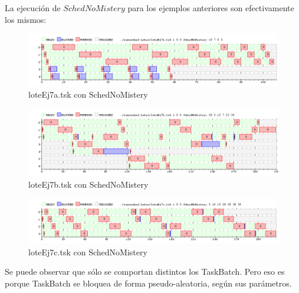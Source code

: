 La ejecuci\'on de $SchedNoMistery$ para los ejemplos anteriores son efectivamente los mismos:

\begin{figure}[H]
  \centering
    \includegraphics[width=1.1\textwidth]{imagenes/Ej7verif1.png}
 \caption{loteEj7a.tsk con SchedNoMistery}
  \label{fig:ej7aNo}
\end{figure}

\begin{figure}[H]
  \centering
    \includegraphics[width=1.1\textwidth]{imagenes/Ej7verif2.png}
 \caption{loteEj7b.tsk con SchedNoMistery}
  \label{fig:ej7bNo}
\end{figure}

\begin{figure}[H]
  \centering
    \includegraphics[width=1.1\textwidth]{imagenes/Ej7verif3.png}
 \caption{loteEj7c.tsk con SchedNoMistery}
  \label{fig:ej7cNo}
\end{figure}

Se puede observar que s\'olo se comportan distintos los TaskBatch. Pero eso es porque TaskBatch se bloquea de forma pseudo-aleatoria, seg\'un sus par\'ametros.
